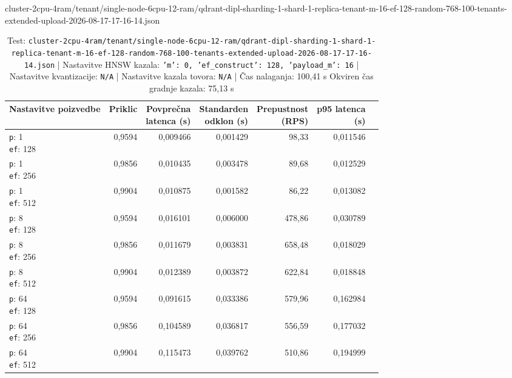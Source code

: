 \begin{table}[htbp]
  \centering
\small
  \caption{cluster-2cpu-4ram/tenant/single-node-6cpu-12-ram/qdrant-dipl-sharding-1-shard-1-replica-tenant-m-16-ef-128-random-768-100-tenants-extended-upload-2026-08-17-17-16-14.json}
  \label{tab:cluster-2cpu-4ram:tenant:single-node-6cpu-12-ram:qdrant-dipl-sharding-1-shard-1-replica-tenant-m-16-ef-128-random-768-100-tenants-extended-upload-2026-08-17-17-16-14.json}
  \begin{tabularx}{\textwidth}{Xrrrrrr}
    \toprule
    Nastavitve poizvedbe & Priklic & \makecell{Povprečna\\latenca (s)} & \makecell{Standarden\\odklon (s)} & \makecell{Prepustnost\\(RPS)} & \makecell{p95 latenca\\(s)}  \\
    \midrule
    \makecell{\texttt{p}: 1\\\texttt{ef}: 128} & 0,9594 & 0,009466 & 0,001429 & 98,33 & 0,011546 \\
    \makecell{\texttt{p}: 1\\\texttt{ef}: 256} & 0,9856 & 0,010435 & 0,003478 & 89,68 & 0,012529 \\
    \makecell{\texttt{p}: 1\\\texttt{ef}: 512} & 0,9904 & 0,010875 & 0,001582 & 86,22 & 0,013082 \\
    \makecell{\texttt{p}: 8\\\texttt{ef}: 128} & 0,9594 & 0,016101 & 0,006000 & 478,86 & 0,030789 \\
    \makecell{\texttt{p}: 8\\\texttt{ef}: 256} & 0,9856 & 0,011679 & 0,003831 & 658,48 & 0,018029 \\
    \makecell{\texttt{p}: 8\\\texttt{ef}: 512} & 0,9904 & 0,012389 & 0,003872 & 622,84 & 0,018848 \\
    \makecell{\texttt{p}: 64\\\texttt{ef}: 128} & 0,9594 & 0,091615 & 0,033386 & 579,96 & 0,162984 \\
    \makecell{\texttt{p}: 64\\\texttt{ef}: 256} & 0,9856 & 0,104589 & 0,036817 & 556,59 & 0,177032 \\
    \makecell{\texttt{p}: 64\\\texttt{ef}: 512} & 0,9904 & 0,115473 & 0,039762 & 510,86 & 0,194999 \\
    \bottomrule
  \end{tabularx}
\caption* {Test: \texttt{cluster-2cpu-4ram/tenant/single-node-6cpu-12-ram/qdrant-dipl-sharding-1-shard-1-replica-tenant-m-16-ef-128-random-768-100-tenants-extended-upload-2026-08-17-17-16-14.json} | Nastavitve HNSW kazala: \texttt{{'m': 0, 'ef\_construct': 128, 'payload\_m': 16}} | Nastavitve kvantizacije: \texttt{N/A} | Nastavitve kazala tovora: \texttt{N/A} | Čas nalaganja: 100,41 s Okviren čas gradnje kazala: 75,13 s}\end{table}


